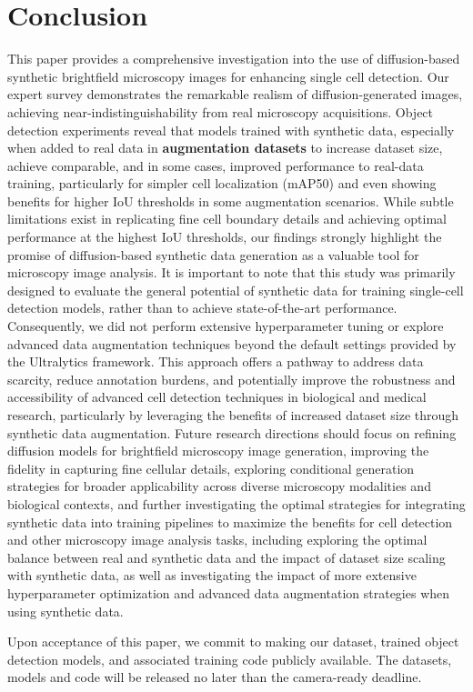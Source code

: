 \section{Conclusion}
\label{sec:conclusion}
This paper provides a comprehensive investigation into the use of diffusion-based synthetic brightfield microscopy images for enhancing single cell detection.
Our expert survey demonstrates the remarkable realism of diffusion-generated images, achieving near-indistinguishability from real microscopy acquisitions.
Object detection experiments reveal that models trained with synthetic data, especially when added to real data in \textbf{augmentation datasets} to increase dataset size, achieve comparable, and in some cases,
improved performance to real-data training, particularly for simpler cell localization (mAP\@50) and even showing benefits for higher IoU thresholds in some augmentation scenarios.
While subtle limitations exist in  replicating fine cell boundary details and achieving optimal performance at the highest IoU thresholds, our findings strongly highlight the promise of diffusion-based synthetic data generation as a valuable tool for microscopy image analysis.
It is important to note that this study was primarily designed to evaluate the general potential of synthetic data for training single-cell detection models, rather than to achieve state-of-the-art performance.
Consequently, we did not perform extensive hyperparameter tuning or explore advanced data augmentation techniques beyond the default settings provided by the Ultralytics framework.
This approach offers a pathway to address data scarcity, reduce annotation burdens, and potentially improve the robustness and accessibility of advanced cell detection techniques in biological and medical research,
particularly by leveraging the benefits of increased dataset size through synthetic data augmentation.
Future research directions should focus on refining diffusion models for brightfield microscopy image generation, improving the fidelity in capturing fine cellular details,
exploring conditional generation strategies for broader applicability across diverse microscopy modalities and biological contexts, and further investigating the optimal strategies for integrating synthetic data into training pipelines
to maximize the benefits for cell detection and other microscopy image analysis tasks, including exploring the optimal balance between real and synthetic data and the impact of dataset size scaling with synthetic data,
as well as investigating the impact of more extensive hyperparameter optimization and advanced data augmentation strategies when using synthetic data.

Upon acceptance of this paper, we commit to making our dataset, trained object detection models, and associated training code publicly available.
The datasets, models and code will be released no later than the camera-ready deadline.
